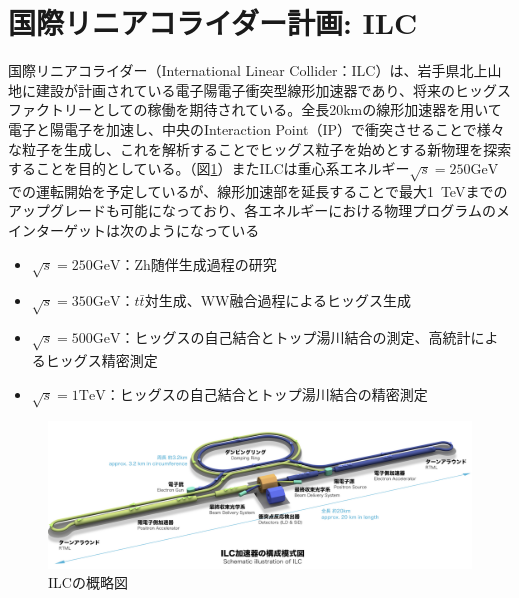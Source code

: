 \section{国際リニアコライダー計画: ILC}
国際リニアコライダー（International Linear Collider：ILC）は、岩手県北上山地に建設が計画されている電子陽電子衝突型線形加速器であり、将来のヒッグスファクトリーとしての稼働を期待されている。全長20kmの線形加速器を用いて電子と陽電子を加速し、中央のInteraction Point（IP）で衝突させることで様々な粒子を生成し、これを解析することでヒッグス粒子を始めとする新物理を探索することを目的としている。（図\ref{ilc}）またILCは重心系エネルギー$\sqrt{s} = 250\mathrm{GeV}$での運転開始を予定しているが、線形加速部を延長することで最大1\ TeVまでのアップグレードも可能になっており、各エネルギーにおける物理プログラムのメインターゲットは次のようになっている
\begin{itemize}
\item $\sqrt{s} = 250 \mathrm{GeV}$：Zh随伴生成過程の研究
\item $\sqrt{s} = 350 \mathrm{GeV}$：$t\bar{t}$対生成、WW融合過程によるヒッグス生成
\item $\sqrt{s} = 500 \mathrm{GeV}$：ヒッグスの自己結合とトップ湯川結合の測定、高統計によるヒッグス精密測定
\item $\sqrt{s} = 1 \mathrm{TeV}$：ヒッグスの自己結合とトップ湯川結合の精密測定
\end{itemize}
\begin{figure}[t]
	\begin{center}
 \includegraphics[keepaspectratio, scale=0.25]
 	{Figure/Introduction/ilc.png}
 		\caption{ILCの概略図}
 		\label{ilc}
	\end{center}
\end{figure}
